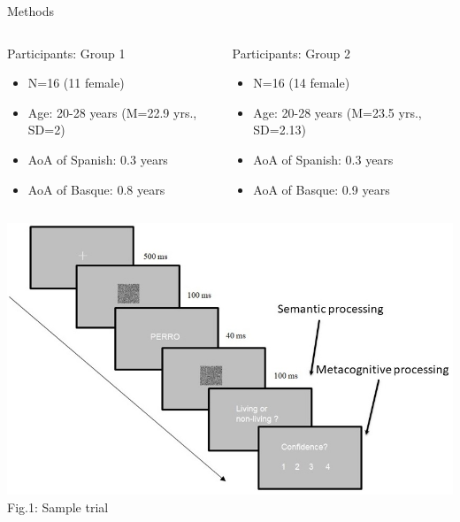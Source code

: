 \documentclass[final,12pt]{beamer}
\begin{document}
\begin{frame}[t]
\begin{columns}[t]
\begin{column}{\halfpagecol}
\begin{block}{Methods}
    \begin{columns}
    \begin{column}{0.49\linewidth}
    \begin{greybox}{Participants: Group 1}
    \begin{itemize}
        \item N=16 (11 female)
        \item Age: 20-28 years {\tiny(M=22.9 yrs., SD=2)}
        \item AoA of Spanish: 0.3 years
        \item AoA of Basque: 0.8 years
        \end{itemize}
    \end{greybox}
    \end{column}
        \begin{column}{0.49\linewidth}
     \begin{greybox}{Participants: Group 2}
    \begin{itemize}
        \item N=16 (14 female)
        \item Age: 20-28 years {\tiny(M=23.5 yrs., SD=2.13)}
        \item AoA of Spanish: 0.3 years
        \item AoA of Basque: 0.9 years
        \end{itemize}
    \end{greybox}
    \end{column}
    \end{columns}    
 
     \vspace{1em}

    \begin{column}{\linewidth}
          \includegraphics[width=\linewidth]{images/sampleTrial}
         \hfill
         \centering
          \scriptsize{\tiny{Fig.1: Sample trial}}
        \end{column}


\end{block}
\end{column}
\end{columns}
\end{frame}
\end{document}
